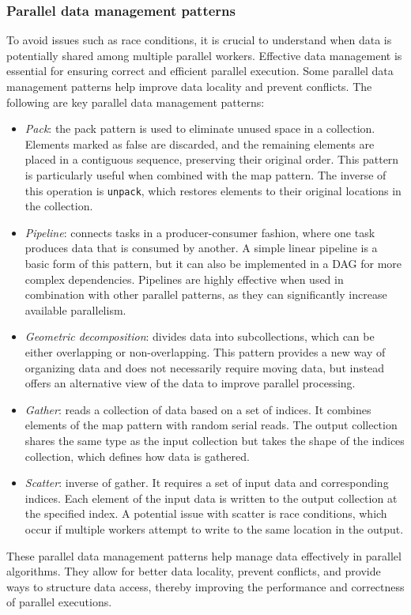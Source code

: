 \subsubsection{Parallel data management patterns}
To avoid issues such as race conditions, it is crucial to understand when data is potentially shared among multiple parallel workers. 
Effective data management is essential for ensuring correct and efficient parallel execution. Some parallel data management patterns help improve data locality and prevent conflicts.
The following are key parallel data management patterns:
\begin{itemize}
    \item \textit{Pack}: the pack pattern is used to eliminate unused space in a collection. 
        Elements marked as false are discarded, and the remaining elements are placed in a contiguous sequence, preserving their original order. 
        This pattern is particularly useful when combined with the map pattern. 
        The inverse of this operation is \texttt{unpack}, which restores elements to their original locations in the collection.
    \item \textit{Pipeline}: connects tasks in a producer-consumer fashion, where one task produces data that is consumed by another. 
        A simple linear pipeline is a basic form of this pattern, but it can also be implemented in a DAG for more complex dependencies. 
        Pipelines are highly effective when used in combination with other parallel patterns, as they can significantly increase available parallelism.
    \item \textit{Geometric decomposition}: divides data into subcollections, which can be either overlapping or non-overlapping. 
        This pattern provides a new way of organizing data and does not necessarily require moving data, but instead offers an alternative view of the data to improve parallel processing.
    \item \textit{Gather}: reads a collection of data based on a set of indices. 
        It combines elements of the map pattern with random serial reads. 
        The output collection shares the same type as the input collection but takes the shape of the indices collection, which defines how data is gathered.
    \item \textit{Scatter}: inverse of gather. It requires a set of input data and corresponding indices. 
        Each element of the input data is written to the output collection at the specified index. 
        A potential issue with scatter is race conditions, which occur if multiple workers attempt to write to the same location in the output.
\end{itemize}
These parallel data management patterns help manage data effectively in parallel algorithms. 
They allow for better data locality, prevent conflicts, and provide ways to structure data access, thereby improving the performance and correctness of parallel executions.

